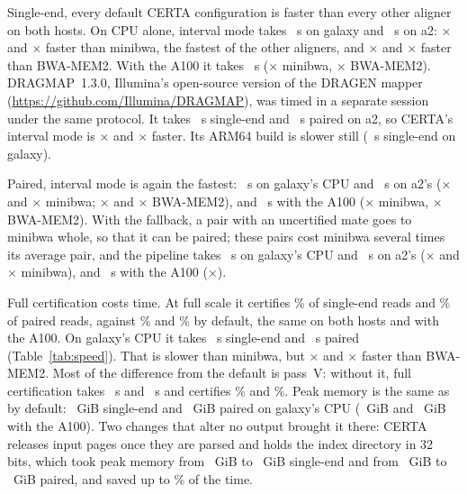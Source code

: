 \documentclass[11pt]{article}
\theoremstyle{definition}
\begin{document}
Single-end, every default CERTA configuration is faster than every other
aligner on both hosts. On CPU alone, interval mode takes \FGSCpuIvWall~s on galaxy and
\FASCpuIvWall~s on a2: \FGSCpuIvXMini$\times$ and \FASCpuIvXMini$\times$
faster than minibwa, the fastest of the other aligners, and
\FGSCpuIvXBwa$\times$ and \FASCpuIvXBwa$\times$ faster than BWA-MEM2. With
the A100 it takes \FGSGpuIvWall~s (\FGSGpuIvXMini$\times$ minibwa,
\FGSGpuIvXBwa$\times$ BWA-MEM2). DRAGMAP~1.3.0, Illumina's open-source
version of the DRAGEN mapper (\url{https://github.com/Illumina/DRAGMAP}),
was timed in a separate session under the same protocol. It takes \KDragASWall~s
single-end and \KDragAPWall~s paired on a2, so CERTA's interval mode is
\KDragASX$\times$ and \KDragAPX$\times$ faster. Its ARM64 build is slower
still (\KDragGSWall~s single-end on galaxy).

Paired, interval mode is again the fastest: \FGPCpuIvWall~s on galaxy's
CPU and \FAPCpuIvWall~s on a2's (\FGPCpuIvXMini$\times$ and
\FAPCpuIvXMini$\times$ minibwa; \FGPCpuIvXBwa$\times$ and
\FAPCpuIvXBwa$\times$ BWA-MEM2), and \FGPGpuIvWall~s with the A100
(\FGPGpuIvXMini$\times$ minibwa, \FGPGpuIvXBwa$\times$ BWA-MEM2). With the
fallback, a pair with an uncertified mate goes to minibwa whole, so that it
can be paired; these pairs cost minibwa several times its average pair,
and the pipeline takes \FGPCpuKtWall~s on galaxy's CPU and
\FAPCpuKtWall~s on a2's (\FGPCpuKtXMini$\times$ and \FAPCpuKtXMini$\times$
minibwa), and \FGPGpuKtWall~s with the A100 (\FGPGpuKtXMini$\times$).

Full certification costs time. At full scale it certifies \FCCertSFc\% of
single-end reads and \FCCertPFc\% of paired reads, against \FCCertSDef\%
and \FCCertPDef\% by default, the same on both hosts and with the A100. On
galaxy's CPU it takes \FCGSFcCpuWall~s single-end and \FCGPFcCpuWall~s
paired (Table~\ref{tab:speed}). That is slower than minibwa, but
\FCGSFcCpuXBwa$\times$ and \FCGPFcCpuXBwa$\times$ faster than BWA-MEM2.
Most of the difference from the default is pass~V: without it, full
certification takes \FCGSNoVCpuWall~s and \FCGPNoVCpuWall~s and certifies
\FCCertSNoV\% and \FCCertPNoV\%. Peak memory is
the same as by default: \FCGSFcCpuRss~GiB single-end and \FCGPFcCpuRss~GiB
paired on galaxy's CPU (\FCGSFcGpuRss~GiB and \FCGPFcGpuRss~GiB with the
A100). Two changes that alter no output brought it there: CERTA releases
input pages once they are parsed and holds the index directory in 32 bits,
which took peak memory from \MemSOld~GiB to \MemSNew~GiB single-end and
from \MemPOld~GiB to \MemPNew~GiB paired, and saved up to
\MemFasterMax\% of the time.
\end{document}
